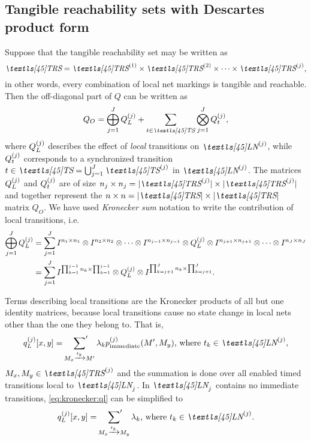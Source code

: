 \subsection{Tangible reachability sets with Descartes product form}

Suppose that the tangible reachability set may be written as
\begin{equation}
  \TRS = \TRS\loc{1} \times \TRS\loc{2} \times \cdots \times
  \TRS\loc{j} \text,
\end{equation}
in other words, every combination of local net markings is tangible
and reachable. Then the off-diagonal part of $Q$ can be written as
\begin{equation}
  Q_O = \bigoplus_{j = 1}^J Q_L\loc{j} + \sum_{t \in \TS} \bigotimes_{j
  = 1}^J Q_t\loc{j} \text, \label{eq:kronecker:simple-local-global}
\end{equation}
where $Q_L^{(j)}$ describes the effect of \emph{local} transitions on
$\LN\loc{j}$, while $Q_t^{(j)}$ corresponds to a synchronized
transition $t \in \TS = \bigcup_{j = 1}^J \TS\loc{j}$ in
$\LN\loc{j}$. The matrices $Q_L^{(j)}$ and $Q_t^{(j)}$ are of size
$n_j \times n_j = \lvert \TRS\loc{j} \rvert \times \lvert \TRS\loc{j}
\rvert$ and together represent the $n \times n = \lvert \TRS \rvert
\times \lvert \TRS \rvert$ matrix $Q_O$. We have used \emph{Kronecker
  sum} notation to write the contribution of local transitions, i.e.
\begin{equation}
  \begin{aligned}
    \bigoplus_{j = 1}^J Q_L^{(j)} &= \sum_{j = 1}^J I^{n_1 \times
      n_1} \otimes I^{n_2 \times n_2} \otimes \cdots \otimes I^{n_{j -
        1} \times n_{j - 1}} \otimes Q_L^{(j)} \otimes I^{n_{j + 1}
      \times
      n_{j + 1}} \otimes \cdots \otimes I^{n_J \times n_J} \\
    &= \sum_{j = 1}^J I^{\prod_{k = 1}^{j - 1} n_k \times \prod_{k =
        1}^{j - 1}} \otimes Q_L^{(j)} \otimes I^{\prod_{k = j +
        1}^{J} n_k \times \prod_{k = j + 1}^{J}} \text.
  \end{aligned}
\end{equation}

Terms describing local transitions are the Kronecker products of all
but one identity matrices, because local transitions cause no state
change in local nets other than the one they belong to. That is,
\begin{equation}
  q_L\loc{j}[x, y] = \sumprime_{M_x \xrightarrow{t_k}
      M'} \lambda_k p_{\text{immediate}}\loc{j}(M', M_y) \text{, where
      $t_k \in \LN\loc{j},$} \label{eq:kronecker:ql}
\end{equation}
$M_x, M_y \in \TRS\loc{j}$ and the summation is done over all
enabled timed transitions local to $\LN_j$. In $\LN_j$ contains no
immediate transitions, \cref{eq:kronecker:ql} can be simplified to
\begin{equation}
  q_L\loc{j}[x, y] = \sumprime_{M_x \xrightarrow{t_k} M_y} \lambda_k
  \text{, where $t_k \in \LN\loc{j}$.}
\end{equation}


